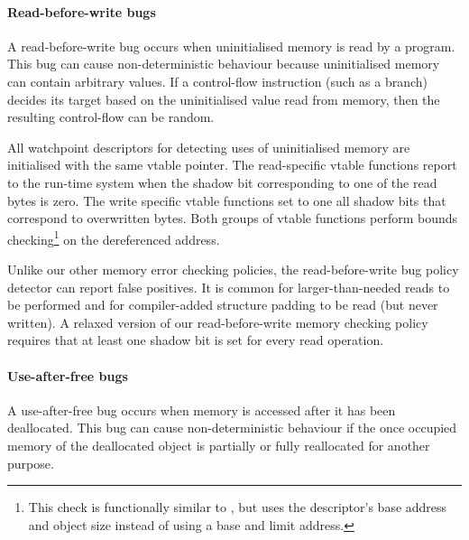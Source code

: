 \documentclass[letterpaper,twocolumn,10pt]{article}
\begin{document}
\paragraph{Read-before-write bugs}
A read-before-write bug occurs when uninitialised memory is read by a program. This bug can cause non-deterministic behaviour because uninitialised memory can contain arbitrary values. If a control-flow instruction (such as a branch) decides its target based on the uninitialised value read from memory, then the resulting control-flow can be random.
 


All watchpoint descriptors for detecting uses of uninitialised memory are initialised with the same vtable pointer. The read-specific vtable functions report to the run-time system when the shadow bit corresponding to one of the read bytes is zero. The write specific vtable functions set to one all shadow bits that correspond to overwritten bytes. Both groups of vtable functions perform bounds checking\footnote{This check is functionally similar to , but uses the descriptor's base address and object size instead of using a base and limit address.} on the dereferenced address. 

Unlike our other memory error checking policies, the read-before-write bug policy detector can report false positives. It is common for larger-than-needed reads to be performed and for compiler-added structure padding to be read (but never written). A relaxed version of our read-before-write memory checking policy requires that at least one shadow bit is set for every read operation.


\paragraph{Use-after-free bugs}
A use-after-free bug occurs when memory is accessed after it has been deallocated. This bug can cause non-deterministic behaviour if the once occupied memory of the  deallocated object is partially or fully reallocated for another purpose.
\end{document}
